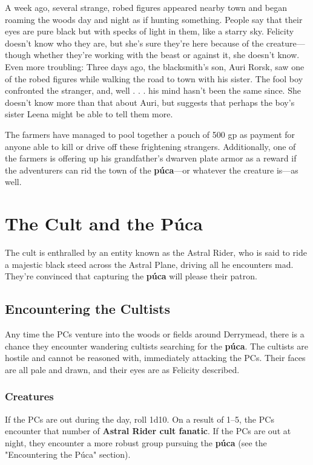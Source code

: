 \documentclass[10pt,a4paper,twoside,bg=print,twocolumn,openany,nodeprecatedcode]{dndbook}
\begin{document}
A week ago, several strange, robed figures appeared nearby town and began roaming the woods day and night as if hunting something. People say that their eyes are pure black but with specks of light in them, like a starry sky. Felicity doesn't know who they are, but she's sure they're here because of the creature—though whether they're working with the beast or against it, she doesn't know. Even more troubling: Three days ago, the blacksmith's son, Auri Rorsk, saw one of the robed figures while walking the road to town with his sister. The fool boy confronted the stranger, and, well . . . his mind hasn't been the same since. She doesn't know more than that about Auri, but suggests that perhaps the boy's sister Leena might be able to tell them more.

The farmers have managed to pool together a pouch of 500 gp as payment for anyone able to kill or drive off these frightening strangers. Additionally, one of the farmers is offering up his grandfather's dwarven plate armor as a reward if the adventurers can rid the town of the \textbf{púca}—or whatever the creature is—as well.

\section{The Cult and the Púca}
The cult is enthralled by an entity known as the Astral Rider, who is said to ride a majestic black steed across the Astral Plane, driving all he encounters mad. They're convinced that capturing the \textbf{púca} will please their patron.

\subsection{Encountering the Cultists}
Any time the PCs venture into the woods or fields around Derrymead, there is a chance they encounter wandering cultists searching for the \textbf{púca}. The cultists are hostile and cannot be reasoned with, immediately attacking the PCs. Their faces are all pale and drawn, and their eyes are as Felicity described.

\subsubsection{Creatures}
If the PCs are out during the day, roll 1d10. On a result of 1–5, the PCs encounter that number of \textbf{Astral Rider cult fanatic}. If the PCs are out at night, they encounter a more robust group pursuing the \textbf{púca} (see the "Encountering the Púca" section).
\end{document}
